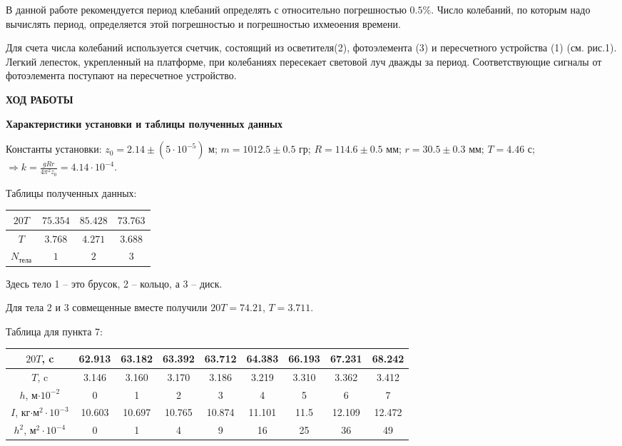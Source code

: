 \documentclass[a4paper,12pt]{article} %
\begin{document}
В данной работе рекомендуется период клебаний определять с относительно погрешностью $0.5\%$. Число колебаний, по которым надо вычислять период, определяется этой погрешностью и погрешностью ихмеоения времени.

Для счета числа колебаний используется счетчик, состоящий из осветителя(2), фотоэлемента (3) и пересчетного устройства (1) (см. рис.1). Легкий лепесток, укрепленный на платформе, при колебаниях пересекает световой луч дважды за период. Соответствующие сигналы от фотоэлемента поступают на пересчетное устройство.

\begin{center}
{\bf ХОД РАБОТЫ}
\end{center}
{\bf Характеристики установки и таблицы полученных данных}

Константы установки: $z_0 = 2.14 \pm (5\cdot 10^{-5})$ м; $m = 1012.5 \pm 0.5$ гр; $R = 114.6 \pm 0.5$ мм; $r = 30.5 \pm 0.3$ мм; $T = 4.46$ с; $\Rightarrow k = \frac{gRr}{4\pi^2 z_0} = 4.14\cdot 10^{-4}$.

Таблицы полученных данных:

\begin{center}
\begin{tabular}{|c|c|c|c|}
\hline 
$20T$ & $75.354$ & $85.428$ & $73.763$\\ 
\hline 
$T$ & $3.768$ & $4.271$ & $3.688$ \\ 
\hline 
$N_{\textbf{тела}}$ & $1$ & $2$ & $3$\\ 
\hline 
\end{tabular} 
\end{center}

Здесь тело 1 -- это брусок, 2 -- кольцо, а 3 -- диск.

Для тела $2$ и $3$ совмещенные вместе получили $20T = 74.21$, $T = 3.711$.

Таблица для пункта 7:
\begin{center}
\begin{tabular}{|c|c|c|c|c|c|c|c|c|}
\hline 
$20T$, c & 62.913 & 63.182 & 63.392 & 63.712 & 64.383 & 66.193 & 67.231 & 68.242\\ 
\hline 
$T$, c & 3.146 & 3.160 & 3.170 & 3.186 & 3.219 & 3.310 & 3.362 & 3.412\\ 
\hline 
$h$, м$\cdot 10^{-2}$ & 0 & 1 & 2 & 3 & 4 & 5 & 6 & 7\\ 
\hline 
$I$, кг$\cdot$м$^2\cdot 10^{-3}$       & 10.603 & 10.697 & 10.765 & 10.874 & 11.101 & 11.5 & 12.109 & 12.472\\ 
\hline 
$h^2$, м$^2\cdot 10^{-4}$ & 0 & 1 & 4 & 9 & 16 & 25 & 36 & 49\\ 
\hline 
\end{tabular} 
\end{center}
\end{document}
